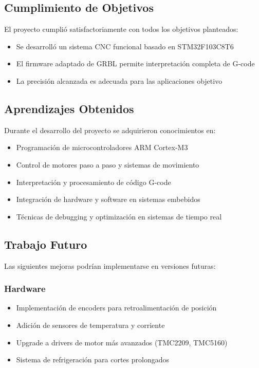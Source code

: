 \documentclass[12pt]{article}
\begin{document}
\subsection{Cumplimiento de Objetivos}

El proyecto cumplió satisfactoriamente con todos los objetivos planteados:

\begin{itemize}
    \item Se desarrolló un sistema CNC funcional basado en STM32F103C8T6
    \item El firmware adaptado de GRBL permite interpretación completa de G-code
    \item La precisión alcanzada es adecuada para las aplicaciones objetivo
\end{itemize}

\subsection{Aprendizajes Obtenidos}

Durante el desarrollo del proyecto se adquirieron conocimientos en:
\begin{itemize}
    \item Programación de microcontroladores ARM Cortex-M3
    \item Control de motores paso a paso y sistemas de movimiento
    \item Interpretación y procesamiento de código G-code
    \item Integración de hardware y software en sistemas embebidos
    \item Técnicas de debugging y optimización en sistemas de tiempo real
\end{itemize}

\subsection{Trabajo Futuro}

Las siguientes mejoras podrían implementarse en versiones futuras:

\subsubsection{Hardware}
\begin{itemize}
    \item Implementación de encoders para retroalimentación de posición
    \item Adición de sensores de temperatura y corriente
    \item Upgrade a drivers de motor más avanzados (TMC2209, TMC5160)
    \item Sistema de refrigeración para cortes prolongados
\end{itemize}
\end{document}
